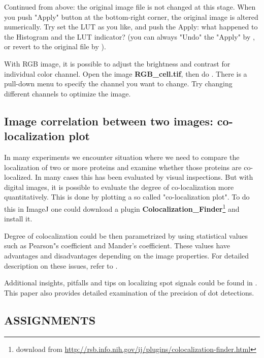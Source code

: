 \begin{indentexercise}{2}
Continued from above: the original image file
is not changed at this stage. When you push
"Apply" button at the bottom-right
corner, the original image is altered numerically. Try set the LUT as
you like, and push the Apply: what happened to the Histogram and the
LUT indicator? (you can always
"Undo" the "Apply" by , 
or revert to the original file by ).
\end{indentexercise}

\begin{indentexercise}{3}
With RGB image, it is possible to adjust the
brightness and contrast for individual color channel. Open the image
\textbf{RGB\_cell.tif}, then do . 
There is a pull-down menu to specify
the channel you want to change. Try changing different channels to
optimize the image. 
\end{indentexercise}

\subsection{Image correlation between two images: co-localization plot}

In many experiments we encounter situation where we need to compare the
localization of two or more proteins and examine whether those proteins
are co-localized. In many cases this has been evaluated by visual
inspections. But with digital images, it is possible to evaluate the
degree of co-localization more quantitatively. This is done by plotting
a so called "co-localization
plot". To do this in ImageJ one could download a
plugin \textbf{Colocalization\_Finder}\footnote{download from \url{http://rsb.info.nih.gov/ij/plugins/colocalization-finder.html}}
and install it.

Degree of colocalization could be then parametrized by using statistical
values such as Pearson"s coefficient and
Mander's coefficient. These values have advantages and
disadvantages depending on the image properties. For detailed
description on these issues, refer to \citet*{BolteJM2006}.

Additional insights, pitfalls and tips on localizing spot signals could
be found in \citet{Waters2009}. This paper also provides detailed examination of the precision of dot detections. 
\clearpage

\subsection{ASSIGNMENTS}

